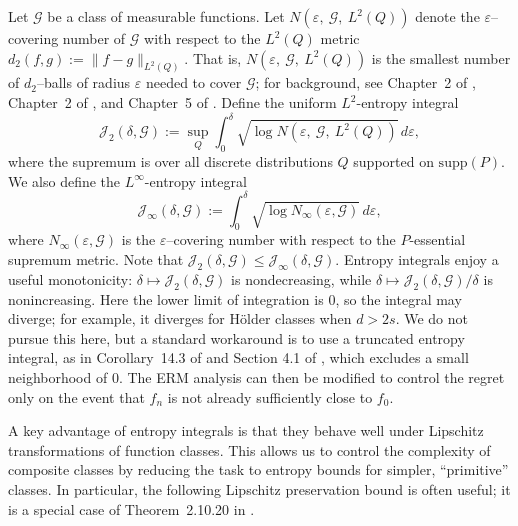 \documentclass[11pt]{article}
\theoremstyle{plain}
\theoremstyle{definition} %
\begin{document}
Let \(\mathcal{G}\) be a class of measurable functions. Let
\(N\left(\varepsilon,\ \mathcal{G},\ L^2(Q)\right)\) denote the \(\varepsilon\)--covering number of \(\mathcal{G}\)
with respect to the \(L^2(Q)\) metric \(d_{2}(f,g) := \|f-g\|_{L^2(Q)}\). That is,
\(N\left(\varepsilon,\ \mathcal{G},\ L^2(Q)\right)\) is the smallest number of \(d_2\)--balls of radius
\(\varepsilon\) needed to cover \(\mathcal{G}\); for background, see Chapter~2 of \cite{sen2018gentle},
Chapter~2 of \cite{van1996weak}, and Chapter~5 of \cite{wainwright2019high}. Define the uniform $L^2$-entropy integral
\[
\mathcal{J}_2(\delta,\mathcal{G})
:= \sup_Q \int_{0}^{\delta} \sqrt{\log N\left(\varepsilon,\ \mathcal{G},\ L^2(Q)\right)}\, d\varepsilon,
\]
where the supremum is over all discrete distributions \(Q\) supported on \(\mathrm{supp}(P)\). We also define the $L^\infty$-entropy integral
\[
\mathcal{J}_{\infty}(\delta, \mathcal{G})
:= \int_0^{\delta} \sqrt{\log N_{\infty}(\varepsilon, \mathcal{G})}\,d\varepsilon,
\]
where \(N_{\infty}(\varepsilon, \mathcal{G})\) is the \(\varepsilon\)--covering number with respect to the
\(P\)-essential supremum metric. Note that \(\mathcal{J}_2(\delta,\mathcal{G}) \le \mathcal{J}_{\infty}(\delta,\mathcal{G})\). Entropy integrals enjoy a useful monotonicity: \(\delta \mapsto \mathcal{J}_2(\delta,\mathcal{G})\) is nondecreasing, while \(\delta \mapsto \mathcal{J}_2(\delta,\mathcal{G})/\delta\) is nonincreasing. Here the lower limit of integration is \(0\), so the integral may diverge; for
example, it diverges for H\"older classes when \(d>2s\). We do not pursue this here, but a standard workaround is to use a truncated
entropy integral, as in Corollary~14.3 of \citealp{wainwright2019high} and Section 4.1 of \cite{foster2023orthogonal}, which
excludes a small neighborhood of \(0\). The ERM analysis can then be modified
to control the regret only on the event that \(\hat f_n\) is not already
sufficiently close to \(f_0\).

A key advantage of entropy integrals is that they behave well under Lipschitz transformations of
function classes. This allows us to control the complexity of composite classes by reducing the task
to entropy bounds for simpler, ``primitive'' classes. In particular, the following Lipschitz preservation bound is often useful; it is
a special case of Theorem~2.10.20 in \citealp{van1996weak}.
\end{document}
